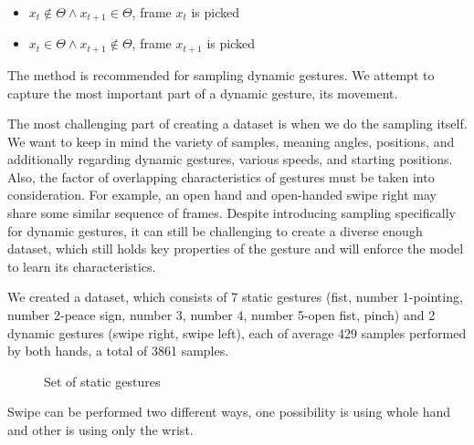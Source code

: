 \begin{enumerate}
\begin{itemize}
        \item $x_{t} \notin \Theta \land x_{t+1} \in \Theta$, frame $x_t$ is picked
        \item $x_{t} \in \Theta \land x_{t+1} \notin \Theta$, frame $x_{t+1}$ is picked
    \end{itemize}
    
    The method is recommended for sampling dynamic gestures. We attempt to capture the most important part of a dynamic gesture, its movement. 

    The most challenging part of creating a dataset is when we do the sampling itself. We want to keep in mind the variety of samples, meaning angles, positions, and additionally regarding dynamic gestures, various speeds, and starting positions. Also, the factor of overlapping characteristics of gestures must be taken into consideration. For example, an open hand and open-handed swipe right may share some similar sequence of frames. Despite introducing sampling specifically for dynamic gestures, it can still be challenging to create a diverse enough dataset, which still holds key properties of the gesture and will enforce the model to learn its characteristics.

    We created a dataset, which consists of 7 static gestures (fist, number 1-pointing, number 2-peace sign, number 3, number 4, number 5-open fist, pinch) and 2 dynamic gestures (swipe right, swipe left), each of average 429 samples performed by both hands, a total of 3861 samples. 

    \begin{figure}[h]
        \centering
        \qquad
        \qquad
        \qquad
        \qquad
        \qquad
        \qquad
        \qquad

        \caption{Set of static gestures}
        \label{static_gestures}
    \end{figure}

    Swipe can be performed two different ways, one possibility is using whole hand and other is using only the wrist.


\end{enumerate}
